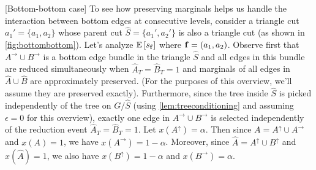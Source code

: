 \begin{example}\label{ex:bottombottom} [Bottom-bottom case]
To see how preserving marginals helps us handle the interaction between bottom edges at consecutive levels, consider a triangle cut $a_1' = \{a_1, a_2\}$ whose parent cut $\hat{S} = \{a_1', a_2'\}$ is also a triangle cut (as shown in \cref{fig:bottombottom}). 
Let's analyze ${\mathbb{E}}\left[s_{\bf f}\right]$ where ${\bf f} = (a_1, a_2)$. Observe first that
$A^\rightarrow\cup B^\rightarrow$ is a bottom edge bundle in the triangle $\hat S$ and all edges in this bundle are reduced simultaneously when $\hat{A}_T = \hat{B}_T = 1$
and marginals of all edges in $\hat{A}\cup\hat{B}$ are approximately preserved. (For the purposes of this overview, we'll assume they are preserved exactly). Furthermore, since the tree inside $\hat{S}$ is picked independently of the tree on $G/\hat{S}$ (using \cref{lem:treeconditioning} and assuming $\epsilon = 0$ for this overview), exactly one edge in $A^\rightarrow\cup B^\rightarrow$ is selected independently of the reduction event $\hat{A}_T = \hat{B}_T = 1$. Let $x(A^\uparrow) = \alpha$. Then since $A = A^\uparrow \cup A ^\rightarrow$ and $x(A)=1$, we have $x(A ^\rightarrow) = 1-\alpha$.
Moreover, since $\hat A = A^\uparrow \cup B^\uparrow$ and $x(\hat A)=1$, we also have
$x(B ^\uparrow) =1- \alpha$ and  $x(B ^\rightarrow) = \alpha$.


\end{example}
